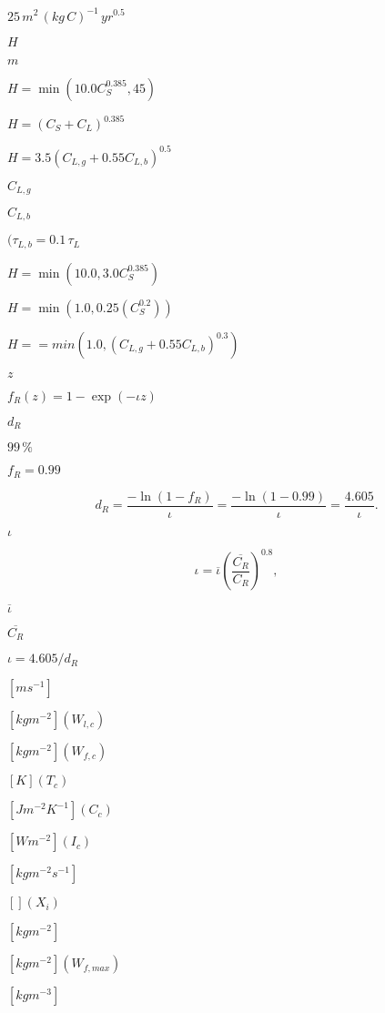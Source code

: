 \documentclass{article}
\begin{document}
$25\,m^2\,(kg\,C)^{-1}\,yr^{0.5}$
\pagebreak

$H$
\pagebreak

$m$
\pagebreak

$ H = \min (10.0C_S^{0.385},45) $
\pagebreak

$ H = (C_S + C_L)^{0.385} $
\pagebreak

$ H = 3.5 (C_{L,g} + 0.55C_{L,b})^{0.5} $
\pagebreak

$C_{L,g}$
\pagebreak

$C_{L,b}$
\pagebreak

$(\tau_{L,b} = 0.1\,\tau_L$
\pagebreak

$ H = \min(10.0,3.0C_S^{0.385}) $
\pagebreak

$ H = \min(1.0, 0.25(C_S^{0.2})) $
\pagebreak

$ H = = min(1.0,(C_{L,g}+0.55C_{L,b})^{0.3}) $
\pagebreak

$z$
\pagebreak

$ f_R(z) = 1 - \exp(-\iota z) $
\pagebreak

$d_R$
\pagebreak

$99\,{\%}$
\pagebreak

$f_R = 0.99$
\pagebreak

\[ \label{rootterm1} d_R = \frac{-\ln(1-f_R)}{\iota} = \frac{-\ln(1 - 0.99)}{\iota} = \frac{4.605}{\iota}. \]
\pagebreak

$\iota$
\pagebreak

\[ \label{iota} \iota = \overline{\iota} \left(\frac{\overline{C_R}}{C_R} \right)^{0.8}, \]
\pagebreak

$\overline{\iota}$
\pagebreak

$\overline{C_R}$
\pagebreak

$\iota = 4.605/d_R$
\pagebreak

$[m s^{-1}]$
\pagebreak

$[kg m^{-2}] (W_{l,c})$
\pagebreak

$[kg m^{-2}] (W_{f,c})$
\pagebreak

$[K] (T_c)$
\pagebreak

$[J m^{-2} K^{-1}] (C_c)$
\pagebreak

$[W m^{-2}] (I_c)$
\pagebreak

$[kg m^{-2} s^{-1}]$
\pagebreak

$[ ] (X_i)$
\pagebreak

$[kg m^{-2}]$
\pagebreak

$[kg m^{-2}] (W_{f,max})$
\pagebreak

$[kg m^{-3}]$
\pagebreak
\end{document}
